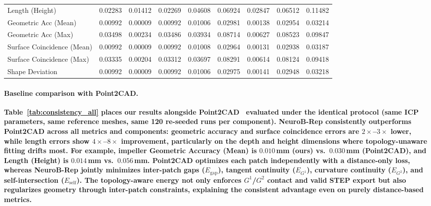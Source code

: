 \documentclass{ieeeaccess}
\providecommand{\DIFaddtex}[1]{{\color{blue}\bfseries #1}} %
\providecommand{\DIFaddbegin}{} %
\providecommand{\DIFaddend}{} %
\providecommand{\DIFadd}[1]{\texorpdfstring{\DIFaddtex{#1}}{#1}} %
\begin{document}
\begin{table}[t]
\begin{tabular}{
      >{\raggedright\arraybackslash}p{3.0cm}
      S S S S
      S S S S
  }
    Length (Height)           & 0.02283 & 0.01412 & 0.02269 & 0.04608  & 0.06924 & 0.02847 & 0.06512 & 0.11482 \\
    Geometric Acc (Mean)      & 0.00992 & 0.00009 & 0.00992 & 0.01006  & 0.02981 & 0.00138 & 0.02954 & 0.03214 \\
    Geometric Acc (Max)       & 0.03498 & 0.00234 & 0.03486 & 0.03934  & 0.08714 & 0.00627 & 0.08523 & 0.09847 \\
    Surface Coincidence (Mean)& 0.00992 & 0.00009 & 0.00992 & 0.01008  & 0.02964 & 0.00131 & 0.02938 & 0.03187 \\
    Surface Coincidence (Max) & 0.03335 & 0.00204 & 0.03312 & 0.03697  & 0.08291 & 0.00614 & 0.08124 & 0.09418 \\
    Shape Deviation           & 0.00992 & 0.00009 & 0.00992 & 0.01006  & 0.02975 & 0.00141 & 0.02948 & 0.03218 \\
    \bottomrule
  \end{tabular}
\end{table}
\DIFaddend 

\DIFaddbegin \paragraph*{\DIFadd{Baseline comparison with Point2CAD.}}
\DIFadd{Table~\ref{tab:consistency_all} places our results alongside Point2CAD~\cite{b2}
evaluated under the identical protocol (same ICP parameters, same reference meshes,
same 120 re-seeded runs per component).
NeuroB-Rep consistently outperforms Point2CAD across all metrics and components:
geometric accuracy and surface coincidence errors are $2{\times}$--$3{\times}$ lower,
while length errors show $4{\times}$--$8{\times}$ improvement, particularly on
the depth and height dimensions where topology-unaware fitting drifts most.
For example, impeller Geometric Accuracy (Mean) is $0.010$\,mm (ours) vs.\
$0.030$\,mm (Point2CAD), and Length (Height) is $0.014$\,mm vs.\ $0.056$\,mm.
Point2CAD optimizes each patch independently with a distance-only loss,
whereas NeuroB-Rep jointly minimizes inter-patch gaps ($E_{\mathrm{gap}}$),
tangent continuity ($E_{G^1}$), curvature continuity ($E_{G^2}$),
and self-intersection ($E_{\mathrm{self}}$).
The topology-aware energy not only enforces $G^1$/$G^2$ contact and
valid STEP export but also regularizes geometry through inter-patch
constraints, explaining the consistent advantage even on purely
distance-based metrics.
}
\end{document}

